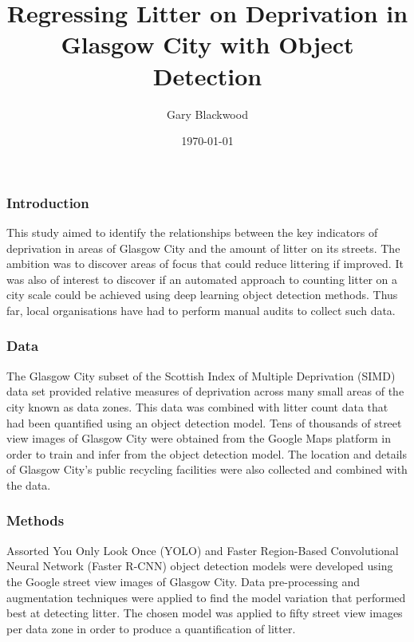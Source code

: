 \documentclass[10pt]{article}
\begin{document}
\title{Regressing Litter on Deprivation in Glasgow City with Object Detection}
\author{Gary Blackwood}
\date{\today}
\maketitle  

\subsubsection*{Introduction}

This study aimed to identify the relationships between the key indicators of deprivation in areas of
Glasgow City and the amount of litter on its streets. The ambition was to discover areas of focus that could
reduce littering if improved. It was also of interest to discover if an automated approach to counting litter on
a city scale could be achieved using deep learning object detection methods. Thus far, local organisations
have had to perform manual audits to collect such data.

\subsubsection*{Data}

The Glasgow City subset of the Scottish Index of Multiple Deprivation (SIMD) data set provided relative measures of deprivation across many small areas of the city known as data zones. This data was combined with litter count data that had been quantified using an object detection model. Tens of thousands of street view images of Glasgow City were obtained from the Google Maps platform in order to train and infer from the object detection model. The location and details of Glasgow City's public recycling facilities were also collected and combined with the data.


\subsubsection*{Methods}

Assorted You Only Look Once (YOLO) and Faster Region-Based Convolutional Neural Network (Faster R-CNN) object detection models were developed using the Google street view images of Glasgow City. Data pre-processing and augmentation techniques were applied to find the model variation that performed best at detecting litter. The chosen model was applied to fifty street view images per data zone in order to produce a quantification of litter.
\end{document}
